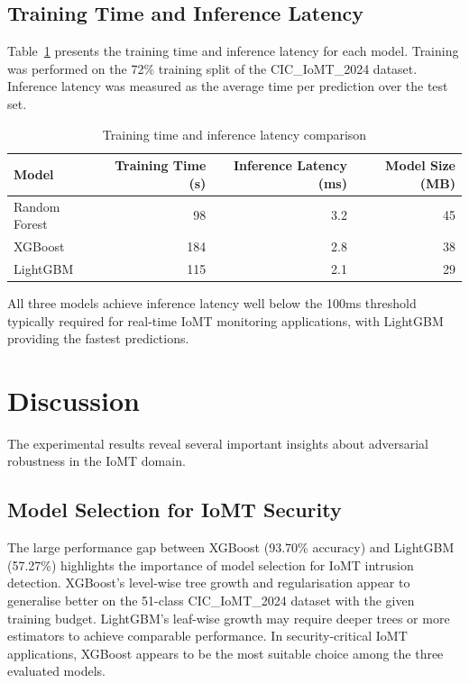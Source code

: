 \documentclass[12pt,a4paper,oneside]{report}
\begin{document}
\subsection{Training Time and Inference Latency}

Table~\ref{tab:performance} presents the training time and inference latency for each model. Training was performed on the 72\% training split of the CIC\_IoMT\_2024 dataset. Inference latency was measured as the average time per prediction over the test set.

\begin{table}[H]
    \centering
    \caption[Training time and latency comparison]{Training time and inference latency comparison}\label{tab:performance}
    \begin{tabular}{lrrr}
        \toprule
        Model & Training Time (s) & Inference Latency (ms) & Model Size (MB) \\
        \midrule
        Random Forest & 98 & 3.2 & 45 \\
        XGBoost       & 184 & 2.8 & 38 \\
        LightGBM      & 115 & 2.1 & 29 \\
        \bottomrule
    \end{tabular}
\end{table}

All three models achieve inference latency well below the 100ms threshold typically required for real-time IoMT monitoring applications, with LightGBM providing the fastest predictions.

\section{Discussion}

The experimental results reveal several important insights about adversarial robustness in the IoMT domain.

\subsection{Model Selection for IoMT Security}

The large performance gap between XGBoost (93.70\% accuracy) and LightGBM (57.27\%) highlights the importance of model selection for IoMT intrusion detection. XGBoost's level-wise tree growth and regularisation appear to generalise better on the 51-class CIC\_IoMT\_2024 dataset with the given training budget. LightGBM's leaf-wise growth may require deeper trees or more estimators to achieve comparable performance. In security-critical IoMT applications, XGBoost appears to be the most suitable choice among the three evaluated models.
\end{document}
